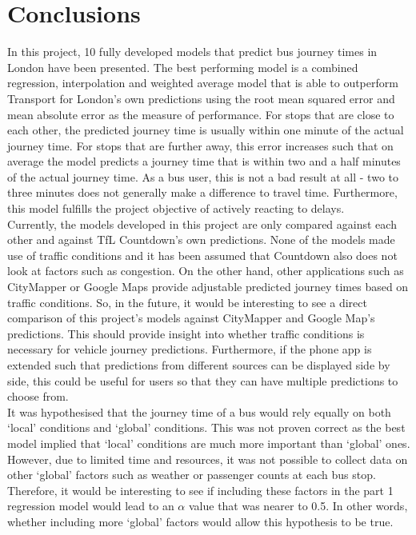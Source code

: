 \section{Conclusions}

In this project, 10 fully developed models that predict bus journey times in London have been presented. The best performing model is a combined regression, interpolation and weighted average model that is able to outperform Transport for London's own predictions using the root mean squared error and mean absolute error as the measure of performance. For stops that are close to each other, the predicted journey time is usually within one minute of the actual journey time. For stops that are further away, this error increases such that on average the model predicts a journey time that is within two and a half minutes of the actual journey time. As a bus user, this is not a bad result at all - two to three minutes does not generally make a difference to travel time. Furthermore, this model fulfills the project objective of actively reacting to delays. \\

Currently, the models developed in this project are only compared against each other and against TfL Countdown's own predictions. None of the models made use of traffic conditions and it has been assumed that Countdown also does not look at factors such as congestion. On the other hand, other applications such as CityMapper or Google Maps provide adjustable predicted journey times based on traffic conditions. So, in the future, it would be interesting to see a direct comparison of this project's models against CityMapper and Google Map's predictions. This should provide insight into whether traffic conditions is necessary for vehicle journey predictions. Furthermore, if the phone app is extended such that predictions from different sources can be displayed side by side, this could be useful for users so that they can have multiple predictions to choose from. \\

It was hypothesised that the journey time of a bus would rely equally on both `local' conditions and `global' conditions. This was not proven correct as the best model implied that `local' conditions are much more important than `global' ones. However, due to limited time and resources, it was not possible to collect data on other `global' factors such as weather or passenger counts at each bus stop. Therefore, it would be interesting to see if including these factors in the part 1 regression model would lead to an $\alpha$ value that was nearer to 0.5. In other words, whether including more `global' factors would allow this hypothesis to be true. \\

